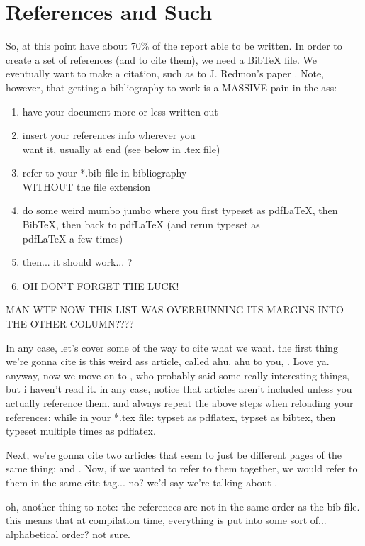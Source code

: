 \documentclass[a4paper,12pt]{article} %
\begin{document}
\section{References and Such} \label {sect_references}
So, at this point have about 70\% of the report able to be written. In order to create a set of references (and to cite them), we need a BibTeX file. We eventually want to make a citation, such as to J. Redmon's paper \cite{red16}. Note, however, that getting a bibliography to work is a MASSIVE pain in the ass:
\begin{enumerate}
\itemsep=-0.5em %
\item have your document more or less written out
\item insert your references info wherever you \\want it, usually at end (see below in .tex file)
\item refer to your *.bib file in bibliography \\WITHOUT the file extension
\item do some weird mumbo jumbo where you first typeset as  pdfLaTeX, then BibTeX, then back to pdfLaTeX (and rerun typeset as\\  pdfLaTeX a few times)
\item then... it should work... ?
\item OH DON'T FORGET THE LUCK!
\end{enumerate}

MAN WTF NOW THIS LIST WAS OVERRUNNING ITS MARGINS INTO THE OTHER COLUMN????

In any case, let's cover some of the way to cite what we want. the first thing we're gonna cite is this weird ass article, called ahu. ahu to you, \cite{ahu61}. Love ya. anyway, now we move on  to \cite{ab94}, who probably said some really interesting things, but i haven't read it. in any case, notice that articles aren't included unless you actually reference them. and always repeat the above steps when reloading your references: while in your *.tex file: typset as pdflatex, typset as bibtex, then typeset multiple times as pdflatex. 

Next, we're gonna cite two articles that seem to just be different pages of the same thing: \cite{m85} and \cite{m99}. Now, if we wanted to refer to them together, we would refer to them in the same cite tag... no? we'd say we're talking about \cite{m85,m99}.

oh, another thing to note: the references are not in the same order as the bib file. this means that at compilation time, everything is put into some sort of... alphabetical order? not sure.
\end{document}
